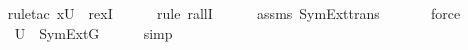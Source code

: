 \begin{isabellebody}
\ \ \ \ \isamarkupfalse%
{\isacharparenleft}{\kern0pt}rule{\isacharunderscore}{\kern0pt}tac\ x{\isacharequal}{\kern0pt}U\ \ rexI{\isacharparenright}{\kern0pt}\isanewline
\ \ \ \ \ \isamarkupfalse%
{\isacharparenleft}{\kern0pt}rule\ rallI{\isacharparenright}{\kern0pt}\isanewline
\ \ \ \ \isamarkupfalse%
\ assms{}\ SymExt{\isacharunderscore}{\kern0pt}trans\isanewline
\ \ \ \ \ \isamarkupfalse%
\ force\ \isanewline
\ \ \ \ \isamarkupfalse%
\ {\isacartoucheopen}U\ {\isasymin}\ SymExt{\isacharparenleft}{\kern0pt}G{\isacharparenright}{\kern0pt}{\isacartoucheclose}\isanewline
\ \ \ \ \isamarkupfalse%
\ simp\isanewline
{}\isamarkupfalse%
%
\endisatagproof
{\isafoldproof}%
%
\isadelimproof
\isanewline
%
\endisadelimproof
\isanewline
\isanewline
{}\isamarkupfalse%
\isanewline
%
\isadelimtheory
%
\endisadelimtheory
%
\isatagtheory
{}\isamarkupfalse%
%
\endisatagtheory
{\isafoldtheory}%
%
\isadelimtheory
%
\endisadelimtheory
%
\end{isabellebody}%
\endinput
